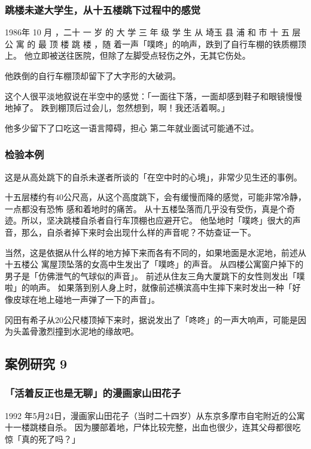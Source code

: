 \documentclass[UTF8]{ctexart}
\begin{document}
\subsubsection*{跳楼未遂大学生，从十五楼跳下过程中的感觉}

1986年 10 月 ，二十 一 岁 的 大 学 三 年 级 学 生 从 埼玉 县 浦 和 市 十 五 层 公 寓 的 最 顶 楼 跳 楼 ，随 着一声「噗咚」的响声，跌到了自行车棚的铁质棚顶上。
他立即被送往医院，但除了左脚受点轻伤之外，无其它伤处。

他跌倒的自行车棚顶却留下了大字形的大破洞。

这个人很平淡地叙说在半空中的感觉：「一面往下落，一面却感到鞋子和眼镜慢慢地掉了。
跌到棚顶后过会儿，忽然想到，啊！我还活着啊。」

他多少留下了口吃这一语言障碍，担心 第二年就业面试可能通不过。 

\subsubsection*{检验本例}


这是从高处跳下的自杀未遂者所谈的「在空中时的心境」，非常少见生还的事例。

十五层楼约有$40$公尺高，从这个高度跳下，会有缓慢而降的感觉，可能非常冷静，一点都没有恐怖
感和着地时的痛苦。
从十五楼坠落而几乎没有受伤，真是个奇迹。所以，坚决跳楼自杀者自行车顶棚也应避开它。
他坠地时「噗咚」很大的声音，那么，自杀者掉下来时会出现什么样的声音呢？不妨查证一下。

当然，这是依据从什么样的地方掉下来而各有不同的，如果地面是水泥地，前述从十五楼公
寓屋顶坠落的女高中生发出了「噗咚」的声音。
从四楼公寓窗户掉下的男子是「仿佛泄气的气球似的声音」。
前述从住友三角大厦跳下的女性则发出「噗啦」的响声。
如果落到别人身上时，就像前述横滨高中生摔下来时发出一种「好像皮球在地上碰地一声弹了一下的声音」。

冈田有希子从$20$公尺楼顶掉下来时，据说发出了「咚咚」的一声大响声，可能是因为头盖骨激烈撞到水泥地的缘故吧。

\subsection{案例研究 9}
\subsubsection*{「活着反正也是无聊」的漫画家山田花子}

1992 年5月24日，漫画家山田花子（当时二十四岁）从东京多摩市自宅附近的公寓十一楼跳楼自杀。
因为腰部着地，尸体比较完整，出血也很少，连其父母都很吃惊「真的死了吗？」
\end{document}
